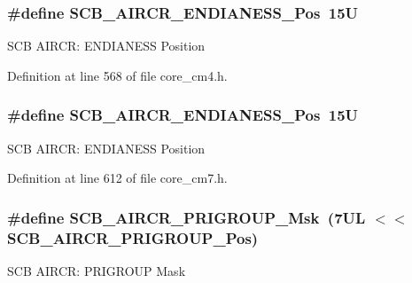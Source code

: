 \subsubsection[{\texorpdfstring{S\+C\+B\+\_\+\+A\+I\+R\+C\+R\+\_\+\+E\+N\+D\+I\+A\+N\+E\+S\+S\+\_\+\+Pos}{SCB_AIRCR_ENDIANESS_Pos}}]{\setlength{\rightskip}{0pt plus 5cm}\#define S\+C\+B\+\_\+\+A\+I\+R\+C\+R\+\_\+\+E\+N\+D\+I\+A\+N\+E\+S\+S\+\_\+\+Pos~15U}\hypertarget{group___c_m_s_i_s___s_c_b_gad31dec98fbc0d33ace63cb1f1a927923}{}\label{group___c_m_s_i_s___s_c_b_gad31dec98fbc0d33ace63cb1f1a927923}
S\+CB A\+I\+R\+CR\+: E\+N\+D\+I\+A\+N\+E\+SS Position 

Definition at line 568 of file core\+\_\+cm4.\+h.

\subsubsection[{\texorpdfstring{S\+C\+B\+\_\+\+A\+I\+R\+C\+R\+\_\+\+E\+N\+D\+I\+A\+N\+E\+S\+S\+\_\+\+Pos}{SCB_AIRCR_ENDIANESS_Pos}}]{\setlength{\rightskip}{0pt plus 5cm}\#define S\+C\+B\+\_\+\+A\+I\+R\+C\+R\+\_\+\+E\+N\+D\+I\+A\+N\+E\+S\+S\+\_\+\+Pos~15U}\hypertarget{group___c_m_s_i_s___s_c_b_gad31dec98fbc0d33ace63cb1f1a927923}{}\label{group___c_m_s_i_s___s_c_b_gad31dec98fbc0d33ace63cb1f1a927923}
S\+CB A\+I\+R\+CR\+: E\+N\+D\+I\+A\+N\+E\+SS Position 

Definition at line 612 of file core\+\_\+cm7.\+h.

\subsubsection[{\texorpdfstring{S\+C\+B\+\_\+\+A\+I\+R\+C\+R\+\_\+\+P\+R\+I\+G\+R\+O\+U\+P\+\_\+\+Msk}{SCB_AIRCR_PRIGROUP_Msk}}]{\setlength{\rightskip}{0pt plus 5cm}\#define S\+C\+B\+\_\+\+A\+I\+R\+C\+R\+\_\+\+P\+R\+I\+G\+R\+O\+U\+P\+\_\+\+Msk~(7\+U\+L $<$$<$ S\+C\+B\+\_\+\+A\+I\+R\+C\+R\+\_\+\+P\+R\+I\+G\+R\+O\+U\+P\+\_\+\+Pos)}\hypertarget{group___c_m_s_i_s___s_c_b_ga8be60fff03f48d0d345868060dc6dae7}{}\label{group___c_m_s_i_s___s_c_b_ga8be60fff03f48d0d345868060dc6dae7}
S\+CB A\+I\+R\+CR\+: P\+R\+I\+G\+R\+O\+UP Mask 

